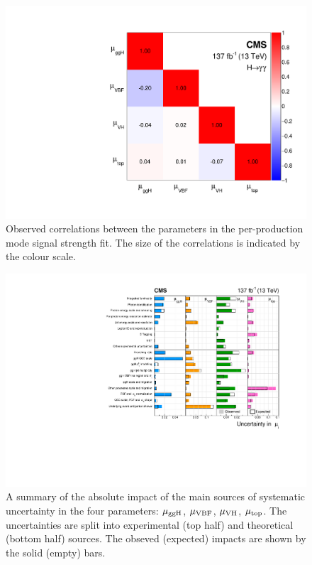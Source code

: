 \begin{figure}[htbp]
  \centering
  \includegraphics[width=.5\textwidth]{Figures/hgg_results/mu_correlations.pdf}
  \caption[Correlations between per-production mode signal strengths]
  {
    Observed correlations between the parameters in the per-production mode signal strength fit. The size of the correlations is indicated by the colour scale.
  }
  \label{fig:corr_mu}
\end{figure}

\begin{figure}[htbp]
  \centering
  \includegraphics[width=1\textwidth]{Figures/hgg_results/mu_systematics.pdf}
  \caption[Impact of systematic uncertainty sources on the per-production mode signal strengths]
  {
    A summary of the absolute impact of the main sources of systematic uncertainty in the four parameters: $\mu_{\rm{ggH}}$, $\mu_{\rm{VBF}}$, $\mu_{\rm{VH}}$, $\mu_{\rm{top}}$. The uncertainties are split into experimental (top half) and theoretical (bottom half) sources. The obseved (expected) impacts are shown by the solid (empty) bars.
  }
  \label{fig:corr_mu}
\end{figure}


\newpage
